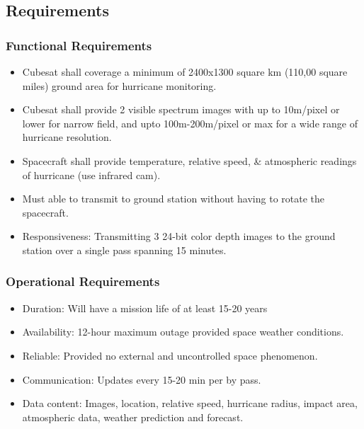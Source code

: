 \subsection{Requirements}
\subsubsection{Functional Requirements}
\begin{itemize}[noitemsep]
  \item 
  Cubesat shall coverage a minimum of 2400x1300 square km (110,00 square miles) ground area for hurricane monitoring.
 \item 
 Cubesat shall provide 2 visible spectrum images with up to 10m/pixel or lower for narrow field, and upto 100m-200m/pixel or max for a wide range of hurricane resolution.
\item
Spacecraft shall provide temperature, relative speed, & atmospheric readings of hurricane (use infrared cam).  
\item
Must able to transmit to ground station without having to rotate the spacecraft.
  \item Responsiveness: Transmitting 3 24-bit color depth images to the ground station over a single pass spanning 15 minutes.
\end{itemize}
\subsubsection{Operational Requirements}
\begin{itemize}[noitemsep]
  \item Duration: Will have a mission life of at least 15-20 years
  \item Availability: 12-hour maximum outage provided space weather conditions.
  \item Reliable: Provided no external and uncontrolled space phenomenon.
  \item Communication: Updates every 15-20 min per by pass.
  \item Data content: Images, location, relative speed, hurricane radius, impact area, atmospheric data, weather prediction and forecast.
  \end{itemize}\\
